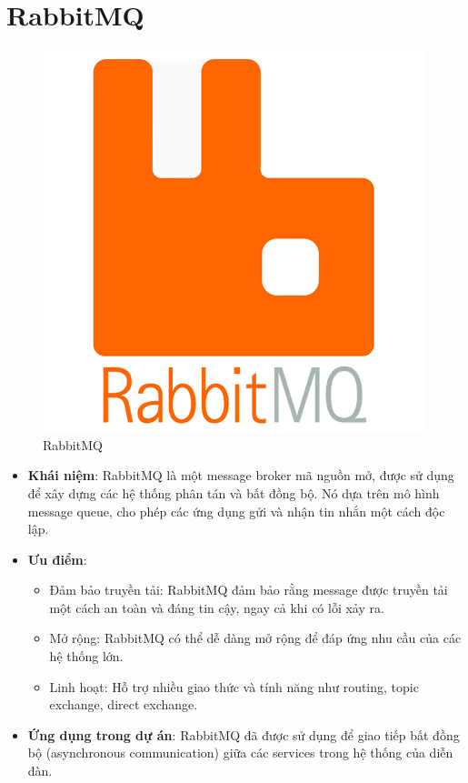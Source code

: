 \documentclass[../index.tex]{subfiles}
\begin{document}
    \section{RabbitMQ}
    \begin{figure}[H]
        \centering
        \includegraphics[width=0.2\linewidth]{figures/tech-logo/rabbitmq.png}
        \caption{RabbitMQ}
    \end{figure}
    \begin{itemize}
        \item \textbf{Khái niệm}: RabbitMQ là một message broker mã nguồn mở,
            được sử dụng để xây dựng các hệ thống phân tán và bất đồng bộ. Nó dựa
            trên mô hình message queue, cho phép các ứng dụng gửi và nhận tin
            nhắn một cách độc lập.

        \item \textbf{Ưu điểm}:
            \begin{itemize}
                \item Đảm bảo truyền tải: RabbitMQ đảm bảo rằng message được
                    truyền tải một cách an toàn và đáng tin cậy, ngay cả khi có lỗi
                    xảy ra.

                \item Mở rộng: RabbitMQ có thể dễ dàng mở rộng để đáp ứng nhu
                    cầu của các hệ thống lớn.

                \item Linh hoạt: Hỗ trợ nhiều giao thức và tính năng như routing,
                    topic exchange, direct exchange.
            \end{itemize}

        \item \textbf{Ứng dụng trong dự án}: RabbitMQ đã được sử dụng để giao tiếp
            bất đồng bộ (asynchronous communication) giữa các services trong hệ thống
            của diễn đàn.
    \end{itemize}

\end{document}
